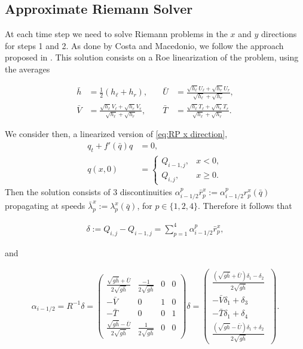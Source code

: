 \documentclass[12pt]{article}
\newcommand{\sgh}{\sqrt{g\bar{h}}} %
\begin{document}
\subsection{Approximate Riemann Solver}

At each time step we need to solve Riemann problems in the $x$ and $y$ directions for steps 1 and 2. 
As done by Costa and Macedonio, we follow the approach proposed in \cite{monthe1999positivity}. 
This solution consists on a Roe linearization of the problem, using the averages

\begin{align}
    \label{eq: Roe averages}
    \bar{h}&=\frac12(h_\ell+h_r), \quad & 
    \bar{U}&=\frac{\sqrt{h_\ell}U_\ell+\sqrt{h_r}U_r}{\sqrt{h_\ell}+\sqrt{h_r}},\\
    \bar{V}&=\frac{\sqrt{h_\ell}V_\ell+\sqrt{h_r}V_r}{\sqrt{h_\ell}+\sqrt{h_r}}, \quad &
    \bar{T}&=\frac{\sqrt{h_\ell}T_\ell+\sqrt{h_r}T_r}{\sqrt{h_\ell}+\sqrt{h_r}}.
\end{align}

We consider then, a linearized version of \eqref{eq:RP x direction},
\begin{align}
            \label{eq:RP x direction Roe}
            q_t+f'(\bar{q})q&=0,\\
            q(x,0)&=\begin{cases}
                Q_{i-1,j}, &x<0,\\
                Q_{i,j}, &x\geq 0.
            \end{cases}
\end{align}
Then the solution consists of 3 discontinuities $\alpha^p_{i-1/2}\bar{r}^x_p:=\alpha^p_{i-1/2}r^x_p(\bar{q})$ propagating at speeds $\bar{\lambda}^x_p:=\lambda^x_p(\bar{q})$, for $p\in\{1,2,4\}$. 
Therefore it follows that

\begin{align}
   \delta:= Q_{i,j}-Q_{i-1,j}=\sum_{p=1}^4 \alpha^p_{i-1/2}\bar{r}^x_p,
\end{align}

and

\begin{align}
    \alpha_{i-1/2}=
    R^{-1}\delta=
    \begin{pmatrix}
        \frac{\sgh+\bar{U}}{2\sgh} & \frac{-1}{2\sgh} & 0 & 0 \\
        -\bar{V} & 0 & 1 & 0\\
        -\bar{T} & 0 & 0 & 1\\
        \frac{\sgh-\bar{U}}{2\sgh} & \frac{1}{2\sgh} & 0 & 0
    \end{pmatrix}
    \delta=
    \begin{pmatrix}
        \frac{ (\sgh+\bar{U})\delta_1-\delta_2}{2\sgh}\\
        -\bar{V}\delta_1+\delta_3\\
        -\bar{T}\delta_1+\delta_4\\
        \frac{ (\sgh-\bar{U})\delta_1+\delta_2}{2\sgh}\
    \end{pmatrix}.
\end{align}
\end{document}
